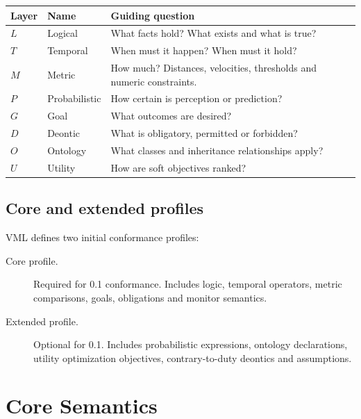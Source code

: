 \documentclass[11pt,a4paper]{article}
\newcommand{\VML}{\textsc{VML}}
\begin{document}
\begin{longtable}{@{}p{}p{}p{}@{}}
\toprule
Layer & Name & Guiding question \\
\midrule
$L$ & Logical & What facts hold? What exists and what is true? \\
$T$ & Temporal & When must it happen? When must it hold? \\
$M$ & Metric & How much? Distances, velocities, thresholds and numeric constraints. \\
$P$ & Probabilistic & How certain is perception or prediction? \\
$G$ & Goal & What outcomes are desired? \\
$D$ & Deontic & What is obligatory, permitted or forbidden? \\
$O$ & Ontology & What classes and inheritance relationships apply? \\
$U$ & Utility & How are soft objectives ranked? \\
\bottomrule
\end{longtable}

\subsection{Core and extended profiles}
\VML{} defines two initial conformance profiles:
\begin{description}
  \item[Core profile.] Required for 0.1 conformance. Includes logic, temporal operators, metric comparisons, goals, obligations and monitor semantics.
  \item[Extended profile.] Optional for 0.1. Includes probabilistic expressions, ontology declarations, utility optimization objectives, contrary-to-duty deontics and assumptions.
\end{description}

\section{Core Semantics}
\end{document}
